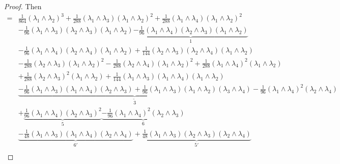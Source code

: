 \documentclass[11pt]{amsart}
\theoremstyle{definition}
\theoremstyle{remark}
\numberwithin{equation}{section}
\begin{document}
\begin{proof}
Then
 \begin{align*}
= & \frac{1}{864}\left(\lambda_1 \wedge \lambda_2\right)^3+\frac{1}{288}\left(\lambda_1 \wedge \lambda_3\right)\left(\lambda_1 \wedge \lambda_2\right)^2+\frac{1}{288}\left(\lambda_1 \wedge \lambda_4\right)\left(\lambda_1 \wedge \lambda_2\right)^2 \\
& -\frac{1}{96}\left(\lambda_1 \wedge \lambda_3\right)\left(\lambda_2 \wedge \lambda_3\right)\left(\lambda_1 \wedge \lambda_2\right)\underbrace{-\frac{1}{96}\left(\lambda_1 \wedge \lambda_4\right)\left(\lambda_2 \wedge \lambda_3\right)\left(\lambda_1 \wedge \lambda_2\right)}_{\boxed{1}} \\
& -\frac{1}{96}\left(\lambda_1 \wedge \lambda_4\right)\left(\lambda_2 \wedge \lambda_4\right)\left(\lambda_1 \wedge \lambda_2\right)+\frac{1}{144}\left(\lambda_2 \wedge \lambda_3\right)\left(\lambda_2 \wedge \lambda_4\right)\left(\lambda_1 \wedge \lambda_2\right) \\
& -\frac{1}{288}\left(\lambda_2 \wedge \lambda_3\right)\left(\lambda_1 \wedge \lambda_2\right)^2-\frac{1}{288}\left(\lambda_2 \wedge \lambda_4\right)\left(\lambda_1 \wedge \lambda_2\right)^2+\frac{1}{288}\left(\lambda_1 \wedge \lambda_4\right)^2\left(\lambda_1 \wedge \lambda_2\right) \\
& +\frac{1}{288}\left(\lambda_2 \wedge \lambda_3\right)^2\left(\lambda_1 \wedge \lambda_2\right)+\frac{1}{144}\left(\lambda_1 \wedge \lambda_3\right)\left(\lambda_1 \wedge \lambda_4\right)\left(\lambda_1 \wedge \lambda_2\right) \\
& \underbrace{-\frac{1}{96}\left(\lambda_1 \wedge \lambda_3\right)\left(\lambda_1 \wedge \lambda_4\right)\left(\lambda_2 \wedge \lambda_3\right)+\frac{1}{96}\left(\lambda_1 \wedge \lambda_3\right)\left(\lambda_1 \wedge \lambda_2\right)\left(\lambda_3 \wedge \lambda_4\right)}_{\boxed{\tilde{3}}}-\frac{1}{96}\left(\lambda_1 \wedge \lambda_4\right)^2\left(\lambda_2 \wedge \lambda_4\right) \\
& +\underbrace{\frac{1}{96}\left(\lambda_1 \wedge \lambda_4\right)\left(\lambda_2 \wedge \lambda_3\right)^2}_{\boxed{5}}\underbrace{-\frac{1}{96}\left(\lambda_1 \wedge \lambda_4\right)^2\left(\lambda_2 \wedge \lambda_3\right)}_{\boxed{6}} \\
& \underbrace{-\frac{1}{48}\left(\lambda_1 \wedge \lambda_3\right)\left(\lambda_1 \wedge \lambda_4\right)\left(\lambda_2 \wedge \lambda_4\right)}_{\boxed{6'}}+\underbrace{\frac{1}{48}\left(\lambda_1 \wedge \lambda_3\right)\left(\lambda_2 \wedge \lambda_3\right)\left(\lambda_2 \wedge \lambda_4\right) }_{\boxed{5'}}\\

\end{align*}
\end{proof}
\end{document}
